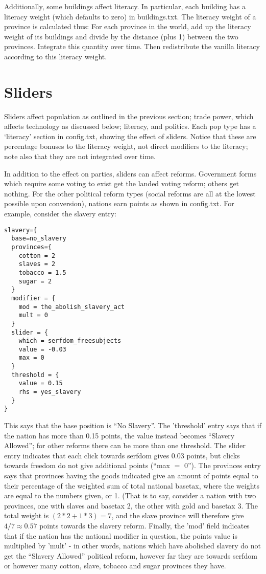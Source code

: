\documentclass[12pt]{article}
\begin{document}
Additionally, some buildings affect literacy. In particular, each
building has a literacy weight (which defaults to zero) in
buildings.txt. The literacy weight of a province is calculated thus:
For each province in the world, add up the literacy weight of its
buildings and divide by the distance (plus 1) between the two
provinces. Integrate this quantity over time. Then redistribute the
vanilla literacy according to this literacy weight. 

\section{Sliders}

Sliders affect population as outlined in the previous section; trade
power, which affects technology as discussed below; literacy, and
politics. Each pop type has a `literacy' section in config.txt,
showing the effect of sliders. Notice that these are percentage
bonuses to the literacy weight, not direct modifiers to the literacy;
note also that they are not integrated over time. 

In addition to the effect on parties, sliders can affect reforms. 
Government forms which require some voting to exist get the landed
voting reform; others get nothing. For the other political reform
types (social reforms are all at the lowest possible upon conversion),
nations earn points as shown in config.txt. For example, consider the
slavery entry:
\begin{verbatim}
slavery={
  base=no_slavery
  provinces={
    cotton = 2
    slaves = 2
    tobacco = 1.5
    sugar = 2
  }
  modifier = {
    mod = the_abolish_slavery_act
    mult = 0
  }
  slider = {
    which = serfdom_freesubjects
    value = -0.03
    max = 0 
  }
  threshold = {
    value = 0.15
    rhs = yes_slavery 
  }
}
\end{verbatim}
This says that the base position is ``No Slavery''. The 'threshold'
entry says that if the nation has more than 0.15 points, the value
instead becomes ``Slavery Allowed''; for other reforms there can be
more than one threshold. The slider entry indicates that each click
towards serfdom gives 0.03 points, but clicks towards freedom do not
give additional points (``max $=$ 0''). The provinces entry
says that provinces having the goods indicated give an amount of
points equal to their percentage of the weighted sum of total national
basetax, where the weights are equal to the numbers given, or 1. (That
is to say, consider a nation with two provinces, one with slaves and
basetax 2, the other with gold and basetax 3. The total weight is
$(2*2 + 1*3)=7$, and the slave province will therefore give
$4/7\approx 0.57$ points towards the slavery reform. Finally, the
'mod' field indicates that if the nation has the national modifier in
question, the points value is multiplied by 'mult' - in other words,
nations which have abolished slavery do not get the ``Slavery
Allowed'' political reform, however far they are towards serfdom or
however many cotton, slave, tobacco and sugar provinces they have. 
\end{document}

